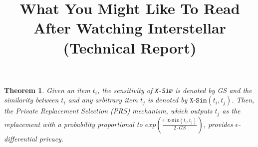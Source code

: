 \documentclass[11pt]{article}
\theoremstyle{plain}
\newtheorem{theorem}{Theorem}
\theoremstyle{definition}
\newtheorem{definition}{Definition}
\newcommand{\graphsim}{\texttt{X-Sim}\xspace}
\begin{document}








\title{What You Might Like To Read After Watching Interstellar \\ (Technical Report)}
\date{\vspace{-5ex}}
\maketitle


\begin{theorem}
Given an item $t_i$, the sensitivity of \graphsim is denoted by GS and the similarity between $t_i$ and any arbitrary item $t_j$ is denoted by $\graphsim(t_i,t_j)$. Then, the Private Replacement Selection (PRS) mechanism, which outputs $t_j$ as the replacement with a probability proportional to $exp(\frac{\epsilon \cdot \graphsim (t_i,t_j)}{2 \cdot GS})$, provides $\epsilon$-differential privacy.
\end{theorem}
\end{document}
